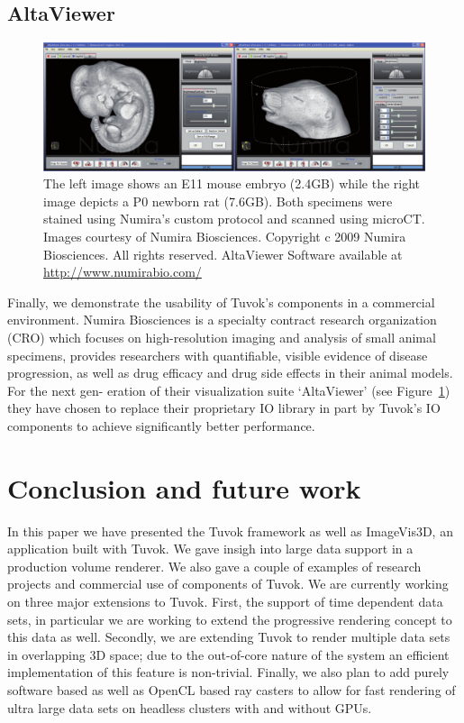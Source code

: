 \subsection{AltaViewer}

\begin{figure}
	\includegraphics[width=\linewidth]{images/arch/altaviewer}

	\caption{The left image shows an E11 mouse embryo
	(2.4GB) while the right image depicts a P0 newborn rat
	(7.6GB). Both specimens were stained using Numira's custom
	protocol and scanned using microCT. Images courtesy
	of Numira Biosciences. Copyright c 2009 Numira Biosciences.
	All rights reserved. AltaViewer Software available
	at \url{http://www.numirabio.com/}}
	\label{fig:altaviewer}
\end{figure}

Finally, we demonstrate the usability of Tuvok's components
in a commercial environment. Numira Biosciences is a specialty
contract research organization (CRO) which focuses
on high-resolution imaging and analysis of small animal
specimens, provides researchers with quantifiable, visible
evidence of disease progression, as well as drug efficacy and
drug side effects in their animal models. For the next gen-
eration of their visualization suite `AltaViewer' (see
Figure~\ref{fig:altaviewer}) they have chosen to replace their
proprietary IO library in part by Tuvok's IO components to achieve
significantly better performance.

\section{Conclusion and future work}

In this paper we have presented the Tuvok framework as well
as ImageVis3D, an application built with Tuvok. We gave insigh
into large data support in a production volume renderer.
We also gave a couple of examples of research projects and
commercial use of components of Tuvok.
We are currently working on three major extensions to
Tuvok. First, the support of time dependent data sets, in
particular we are working to extend the progressive rendering
concept to this data as well. Secondly, we are extending
Tuvok to render multiple data sets in overlapping 3D space;
due to the out-of-core nature of the system an efficient
implementation of this feature is non-trivial. Finally, we also
plan to add purely software based as well as OpenCL based
ray casters to allow for fast rendering of ultra large data sets
on headless clusters with and without GPUs.

